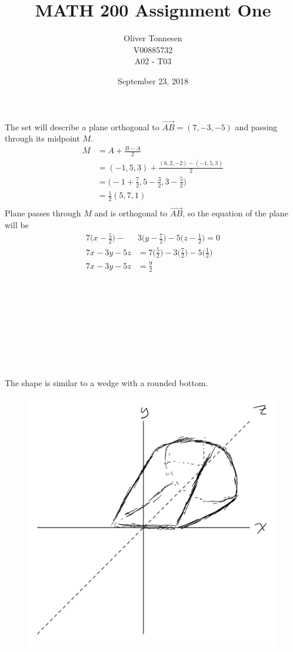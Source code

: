 \documentclass{article}
\title{MATH 200 Assignment One}
\author{%
	Oliver Tonnesen\\
	V00885732\\
	A02 \-- T03}
\date{September 23, 2018}
\begin{document}
\maketitle
\section{}
The set will describe a plane orthogonal to $\vec{AB}=(7,-3,-5)$ and passing through its midpoint $M$.
\begin{align*}
	M&=A+\frac{B-A}{2}\\
	&=(-1,5,3)+\frac{(6,2,-2)-(-1,5,3)}{2}\\
	&=\bigg(-1+\frac{7}{2},5-\frac{3}{2},3-\frac{5}{2}\bigg)\\
	&=\frac{1}{2}(5,7,1)\\
\end{align*}
Plane passes through $M$ and is orthogonal to $\vec{AB}$, so the equation of the plane will be
\begin{align*}
	7\bigg(x-\frac{5}{2}\bigg)-&3\bigg(y-\frac{7}{2}\bigg)-5\bigg(z-\frac{1}{2}\bigg)=0\\
	7x-3y-5z&=7\bigg(\frac{5}{2}\bigg)-3\bigg(\frac{7}{2}\bigg)-5\bigg(\frac{1}{2}\bigg)\\
	7x-3y-5z&=\frac{9}{2}
\end{align*}
\\\\\\\\\\\\\\
\section{}
	The shape is similar to a wedge with a rounded bottom.
	\begin{figure}[h]
		\includegraphics[scale=0.25]{q2bw.png}
	\end{figure}
\end{document}
